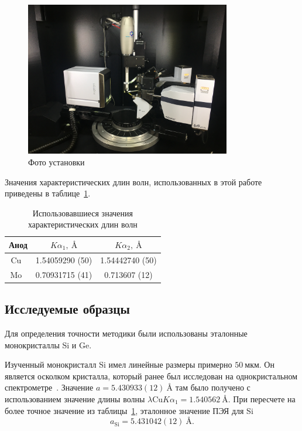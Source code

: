 \documentclass[a4paper,14pt]{extarticle}
\newcommand{\unit}[1]{ \ \text{#1}}
\newcounter{x}
\begin{document}
\begin{figure}[ht!]\label{fig:D8_photo}
    \centering
    \includegraphics[width=0.8\textwidth]{d8_3.jpeg}
    \caption{Фото установки}
\end{figure}

Значения характеристических длин волн, использованных в этой работе приведены в таблице~\ref{tab:wavelengths}.
\begin{table}[ht!]\label{tab:wavelengths}
    \centering
    \begin{tabular}{|c|c|c|}  
        \hline
        Анод & $K\alpha_1,\unit{\AA}$ & $K\alpha_2,\unit{\AA}$ \\
        \hline
        Cu~\cite{Holzer:1997} & 1.54059290 (50) & 1.54442740 (50) \\
        Mo~\cite{Deslattes:1985} & 0.70931715 (41) & 0.713607 (12) \\
        \hline
    \end{tabular}
    \caption{Использовавшиеся значения характеристических длин волн}
\end{table}
\subsection{Исследуемые образцы}
Для определения точности методики были использованы эталонные монокристаллы Si и Ge.

Изученный монокристалл Si имел линейные размеры примерно $50 \unit{мкм}$.
Он является осколком кристалла, который ранее был исследован на однокристальном спектрометре~\cite{Lisoivan:1982}.
Значение $a = 5.430933(12)\unit{\AA}$ там было получено с использованием значение длины волны $\lambda \text{Cu} K \alpha_1 = 1.540562\unit{\AA}$.
При пересчете на более точное значение из таблицы~\ref{tab:wavelengths}, эталонное значение ПЭЯ для Si
\[ a_\text{Si} = 5.431042 (12)\unit{\AA}. \]
\end{document}
